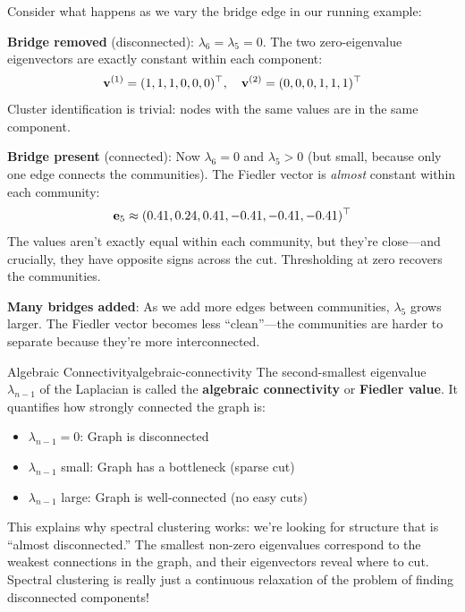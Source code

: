 \begin{notechapter}
\begin{intuition}
Consider what happens as we vary the bridge edge in our running example:

\textbf{Bridge removed} (disconnected): $\lambda_6 = \lambda_5 = 0$. The two zero-eigenvalue eigenvectors are exactly constant within each component:
\[
\mathbf{v}^{(1)} = (1,1,1,0,0,0)^\top, \quad \mathbf{v}^{(2)} = (0,0,0,1,1,1)^\top
\]
Cluster identification is trivial: nodes with the same values are in the same component.

\textbf{Bridge present} (connected): Now $\lambda_6 = 0$ and $\lambda_5 > 0$ (but small, because only one edge connects the communities). The Fiedler vector is \textit{almost} constant within each community:
\[
\mathbf{e}_5 \approx (0.41, 0.24, 0.41, -0.41, -0.41, -0.41)^\top
\]
The values aren't exactly equal within each community, but they're close---and crucially, they have opposite signs across the cut. Thresholding at zero recovers the communities.

\textbf{Many bridges added}: As we add more edges between communities, $\lambda_5$ grows larger. The Fiedler vector becomes less ``clean''---the communities are harder to separate because they're more interconnected.
\end{intuition}

\begin{definition}{Algebraic Connectivity}{algebraic-connectivity}
The second-smallest eigenvalue $\lambda_{n-1}$ of the Laplacian is called the \textbf{algebraic connectivity} or \textbf{Fiedler value}. It quantifies how strongly connected the graph is:
\begin{itemize}
    \item $\lambda_{n-1} = 0$: Graph is disconnected
    \item $\lambda_{n-1}$ small: Graph has a bottleneck (sparse cut)
    \item $\lambda_{n-1}$ large: Graph is well-connected (no easy cuts)
\end{itemize}
\end{definition}

\begin{remark}
This explains why spectral clustering works: we're looking for structure that is ``almost disconnected.'' The smallest non-zero eigenvalues correspond to the weakest connections in the graph, and their eigenvectors reveal where to cut. Spectral clustering is really just a continuous relaxation of the problem of finding disconnected components!
\end{remark}


\end{notechapter}
